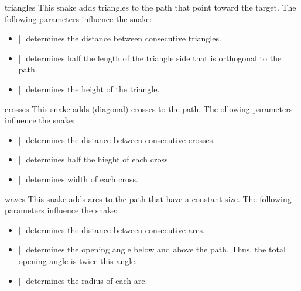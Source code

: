 \begin{snake}{triangles}
  This snake adds triangles to the path that point toward the
  target. The following parameters influence the snake: 
  \begin{itemize}
  \item |\pgfsnakesegmentlength|
    determines the distance between consecutive triangles.
  \item |\pgfsnakesegmentamplitude|
    determines half the length of the triangle side that is orthogonal
    to the path.
  \item |\pgfsnakesegmentobjectlength|
    determines the height of the triangle.
  \end{itemize}
\begin{codeexample}[]
\end{codeexample}
\end{snake}

\begin{snake}{crosses}
  This snake adds (diagonal) crosses to the path. The ollowing
  parameters influence the snake:  
  \begin{itemize}
  \item |\pgfsnakesegmentlength|
    determines the distance between consecutive crosses.
  \item |\pgfsnakesegmentamplitude|
    determines half the hieght of each cross.
  \item |\pgfsnakesegmentobjectlength|
    determines width of each cross.
  \end{itemize}
\begin{codeexample}[]
\end{codeexample}
\end{snake}


\begin{snake}{waves}
  This snake adds arcs to the path that have a constant size. The
  following parameters influence the snake: 
  \begin{itemize}
  \item |\pgfsnakesegmentlength|
    determines the distance between consecutive arcs.
  \item |\pgfsnakesegmentangle|
    determines the opening angle below and above the path. Thus, the
    total opening angle is twice this angle.
  \item |\pgfsnakesegmentamplitude|
    determines the radius of each arc.
  \end{itemize}
\begin{codeexample}[]
\end{codeexample}
\end{snake}



